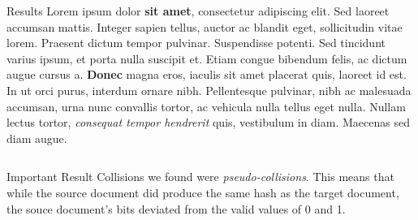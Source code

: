 \documentclass[final]{beamer}
\newlength{\onecolwid}
\newlength{\twocolwid}
\begin{document}
\begin{frame}[t]
\begin{columns}[t]
\begin{column}{\twocolwid}
\begin{columns}[t,totalwidth=\twocolwid]
\begin{column}{\onecolwid}
\begin{block}{Results}
Lorem ipsum dolor \textbf{sit amet}, consectetur adipiscing elit. Sed laoreet accumsan mattis. Integer sapien tellus, auctor ac blandit eget, sollicitudin vitae lorem. Praesent dictum tempor pulvinar. Suspendisse potenti. Sed tincidunt varius ipsum, et porta nulla suscipit et. Etiam congue bibendum felis, ac dictum augue cursus a. \textbf{Donec} magna eros, iaculis sit amet placerat quis, laoreet id est. In ut orci purus, interdum ornare nibh. Pellentesque pulvinar, nibh ac malesuada accumsan, urna nunc convallis tortor, ac vehicula nulla tellus eget nulla. Nullam lectus tortor, \textit{consequat tempor hendrerit} quis, vestibulum in diam. Maecenas sed diam augue.

\end{block}


\end{column} %

\end{columns} %


\begin{alertblock}{Important Result}
    Collisions we found were \emph{pseudo-collisions}. This means that while the
    source document did produce the same hash as the target document, the souce
    document's bits deviated from the valid values of 0 and 1.
\end{alertblock} 


\begin{columns}[t,totalwidth=\twocolwid] %

\begin{column}{\onecolwid} %



\end{column}
\end{columns}
\end{column}
\end{columns}
\end{frame}
\end{document}
